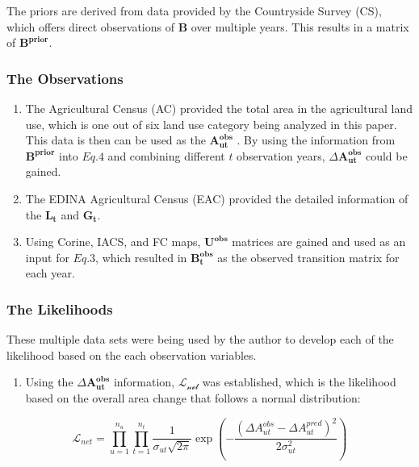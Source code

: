 \documentclass[
  letterpaper,
  DIV=11,
  numbers=noendperiod]{scrartcl}
\providecommand{\tightlist}{%
  \setlength{\itemsep}{0pt}\setlength{\parskip}{0pt}}\usepackage{longtable,booktabs,array}
\begin{document}
The priors are derived from data provided by the Countryside Survey
(CS), which offers direct observations of \(\mathbf{B}\) over multiple
years. This results in a matrix of \(\mathbf{B^{prior}}\).

\hypertarget{the-observations}{%
\subsubsection{The Observations}\label{the-observations}}

\begin{enumerate}
\def\labelenumi{\arabic{enumi}.}
\item
  The Agricultural Census (AC) provided the total area in the
  agricultural land use, which is one out of six land use category being
  analyzed in this paper. This data is then can be used as the
  \(\mathbf{A_{ut}^{obs}}\) . By using the information from
  \(\mathbf{B^{prior}}\) into \(Eq. 4\) and combining different \(t\)
  observation years, \(\Delta \mathbf{A_{ut}^{obs}}\) could be gained.
\item
  The EDINA Agricultural Census (EAC) provided the detailed information
  of the \(\mathbf{L_t}\) and \(\mathbf{G_t}\).
\item
  Using Corine, IACS, and FC maps, \(\mathbf{U^{obs}}\) matrices are
  gained and used as an input for \(Eq. 3\), which resulted in
  \(\mathbf{B_{t}^{obs}}\) as the observed transition matrix for each
  year.
\end{enumerate}

\hypertarget{the-likelihoods}{%
\subsubsection{The Likelihoods}\label{the-likelihoods}}

These multiple data sets were being used by the author to develop each
of the likelihood based on the each observation variables.

\begin{enumerate}
\def\labelenumi{\arabic{enumi}.}
\tightlist
\item
  Using the \(\Delta \mathbf{A_{ut}^{obs}}\) information,
  \(\mathcal{L_{net}}\) was established, which is the likelihood based
  on the overall area change that follows a normal distribution:
\end{enumerate}

\[\mathcal{L}_{net} = \prod_{u=1}^{n_u} \prod_{t=1}^{n_t} \frac{1}{\sigma_{ut}\sqrt{2\pi}} \exp \left( -\frac{(\Delta A_{ut}^{obs} - \Delta A_{ut}^{pred})^2}{2 \sigma_{ut}^2} \right) \tag{5}\]
\end{document}
